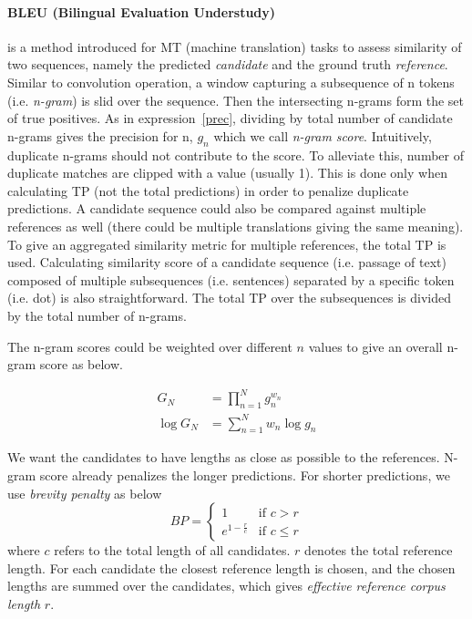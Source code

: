 \documentclass{article}
\begin{document}
\paragraph{BLEU (Bilingual Evaluation Understudy)}
is a method introduced for MT (machine translation) tasks to assess similarity of two sequences, namely the predicted \textit{candidate} and the ground truth \textit{reference}. Similar to convolution operation, a window capturing a subsequence of n tokens (i.e. \textit{n-gram}) is slid over the sequence. Then the intersecting n-grams form the set of true positives. As in expression~\ref{prec}, dividing by total number of candidate n-grams gives the precision for n, $g_n$ which we call \textit{n-gram score}. Intuitively, duplicate n-grams should not contribute to the score. To alleviate this, number of duplicate matches are clipped with a value (usually 1). This is done only when calculating TP (not the total predictions) in order to penalize duplicate predictions. A candidate sequence could also be compared against multiple references as well (there could be multiple translations giving the same meaning). To give an aggregated similarity metric for multiple references, the total TP is used. Calculating similarity score of a candidate sequence (i.e. passage of text) composed of multiple subsequences (i.e. sentences) separated by a specific token (i.e. dot) is also straightforward. The total TP over the subsequences is divided by the total number of n-grams.

The n-gram scores could be weighted over different $n$ values to give an overall n-gram score as below.

\begin{align}
    G_N &= \prod_{n=1}^{N}g_n^{w_n}\\
    \log G_N &= \sum_{n=1}^{N}w_n\log g_n
\end{align}

We want the candidates to have lengths as close as possible to the references. N-gram score already penalizes the longer predictions. For shorter predictions, we use \textit{brevity penalty} as below
\begin{equation}
    BP = \begin{cases}
        1 & \text{if } c > r\\
        e^{1-\frac{r}{c}} & \text{if } c \leq r
    \end{cases}
\end{equation}
where $c$ refers to the total length of all candidates. $r$ denotes the total reference length. For each candidate the closest reference length is chosen, and the chosen lengths are summed over the candidates, which gives \textit{effective reference corpus length} $r$.
\end{document}
